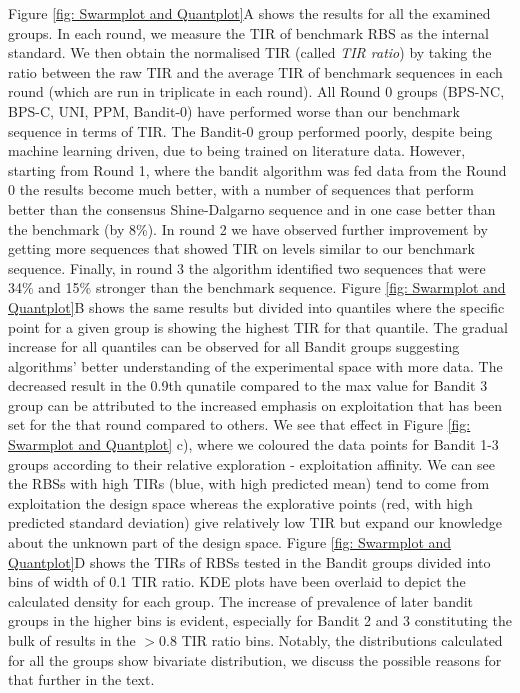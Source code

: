 \documentclass{article}
\begin{document}
Figure \ref{fig: Swarmplot and Quantplot}A shows the results for all the examined groups. 
In each round, we measure the TIR of benchmark RBS as the internal standard. 
We then obtain the normalised TIR (called \textit{TIR ratio}) by taking the ratio between the raw TIR and the average TIR of benchmark sequences in each round (which are run in triplicate in each round).
All Round 0 groups (BPS-NC, BPS-C, UNI, PPM, Bandit-0) have performed worse than our benchmark sequence in terms of TIR. 
The Bandit-0 group performed poorly, despite being machine learning driven, due to being trained on literature data.
However, starting from Round 1, where the bandit algorithm was fed data from the Round 0 the results become much better, with a number of sequences that perform better than the consensus Shine-Dalgarno sequence and in one case better than the benchmark (by 8\%).
In round 2 we have observed further improvement by getting more sequences that showed TIR on levels similar to our benchmark sequence.
Finally, in round 3 the algorithm identified two sequences that were 34\% and 15\% stronger than the benchmark sequence.
Figure \ref{fig: Swarmplot and Quantplot}B shows the same results but divided into quantiles where the specific point for a given group is showing the highest TIR for that quantile.
The gradual increase for all quantiles can be observed for all Bandit groups suggesting algorithms' better understanding of the experimental space with more data.
The decreased result in the 0.9th qunatile compared to the max value for Bandit 3 group can be attributed to the increased emphasis on exploitation that has been set for the that round compared to others.
We see that effect in Figure \ref{fig: Swarmplot and Quantplot} c), where we coloured the data points for Bandit 1-3 groups according to their relative exploration - exploitation affinity.
We can see the RBSs with high TIRs (blue, with high predicted mean) tend to come from exploitation the design space whereas the explorative points (red, with high predicted standard deviation) give relatively low TIR but expand our knowledge about the unknown part of the design space. 
Figure \ref{fig: Swarmplot and Quantplot}D shows the TIRs of RBSs tested in the Bandit groups divided into bins of width of 0.1 TIR ratio.
KDE plots have been overlaid to depict the calculated density for each group.
The increase of prevalence of later bandit groups in the higher bins is evident, especially for Bandit 2 and 3 constituting the bulk of results in the $>0.8$ TIR ratio bins.
Notably, the distributions calculated for all the groups show bivariate distribution, we discuss the possible reasons for that further in the text.\\
\end{document}
